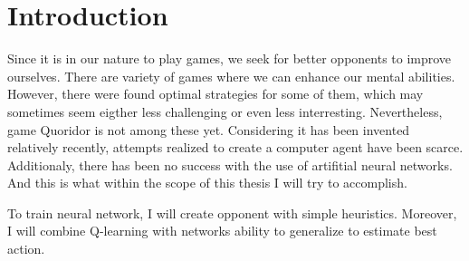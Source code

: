 \chapter{Introduction}\label{chap:1}

Since it is in our nature to play games, we seek for better opponents to
improve ourselves.
There are variety of games where we can enhance our mental abilities.
However, there were found optimal strategies for some of them, which may
sometimes seem eigther less challenging or even less interresting.
Nevertheless, game Quoridor is not among these yet.
Considering it has been invented relatively recently, attempts realized
to create a computer agent have been scarce.
Additionaly, there has been no success with the use of artifitial neural
networks.
And this is what within the scope of this thesis I will try to accomplish.

To train neural network, I will create opponent with simple heuristics.
Moreover, I will combine Q-learning with networks ability to generalize
to estimate best action.
